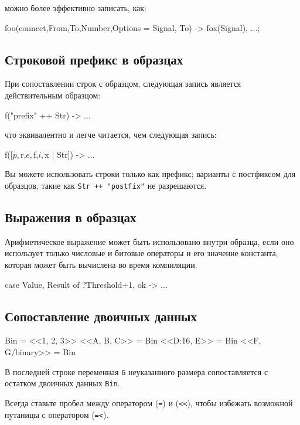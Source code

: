 можно более эффективно записать, как:

\begin{erlang}
foo({connect,From,To,Number,Options} = Signal, To) ->
    fox(Signal),
    ...;
\end{erlang}


\subsection{Строковой префикс в образцах}

При сопоставлении строк с образцом, следующая запись является действительным 
образцом:

\begin{erlang}
f("prefix" ++ Str) -> ...
\end{erlang}

что эквивалентно и легче читается, чем следующая запись:

\begin{erlang}
f([$p,$r,$e,$f,$i,$x | Str]) -> ...
\end{erlang}

Вы можете использовать строки только как префикс; варианты с постфиксом для 
образцов, такие как \texttt{Str ++ "postfix"} не разрешаются. 


\subsection{Выражения в образцах}

Арифметическое выражение может быть использовано внутри образца, если оно 
использует только числовые и битовые операторы и его значение константа, которая
может быть вычислена во время компиляции.

\begin{erlang}
case {Value, Result} of
    {?Threshold+1, ok} -> ...   %
\end{erlang}


\subsection{Сопоставление двоичных данных}

\begin{erlang}
Bin = <<1, 2, 3>>      %
<<A, B, C>> = Bin      %
<<D:16, E>> = Bin      %
<<F, G/binary>> = Bin  %
\end{erlang}

В последней строке переменная \texttt{G} неуказанного размера сопоставляется с 
остатком двоичных данных \texttt{Bin}.

Всегда ставьте пробел между оператором (\texttt{=}) и (\verb|<<|), чтобы избежать
возможной путаницы с оператором (\texttt{=<}).


